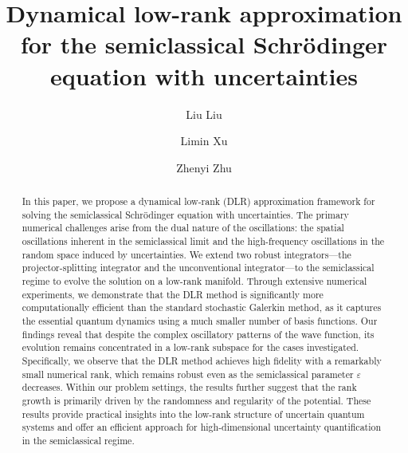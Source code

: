 \documentclass[preprint,11pt]{elsarticle}
\newcommand{\LL}[1]{\textcolor{blue}{~#1}}
\begin{document}
\title{Dynamical low-rank approximation for the semiclassical Schr\"{o}dinger equation with uncertainties}




\author[1]{Liu Liu}

\author[2]{Limin Xu}

\author[3]{Zhenyi Zhu}


\address[1]{Department of Mathematics, The Chinese University of Hong Kong, Hong Kong, 999077, China}

\address[2]{Institute for Theoretical Sciences, Westlake University, Hangzhou, 310030, China}
            
\address[3]{Department of Mathematics, The Chinese University of Hong Kong, Hong Kong, 999077, China}


\begin{abstract}
In this paper, we propose a dynamical low-rank (DLR) approximation framework for solving the semiclassical Schrödinger equation with uncertainties. The primary numerical challenges arise from the dual nature of the oscillations: the spatial oscillations inherent in the semiclassical limit and the high-frequency oscillations in the random space induced by uncertainties. We extend two robust integrators—the projector-splitting integrator and the unconventional integrator—to the semiclassical regime to evolve the solution on a low-rank manifold. Through extensive numerical experiments, we demonstrate that the DLR method is significantly more computationally efficient than the standard stochastic Galerkin method, as it captures the essential quantum dynamics using a much smaller number of basis functions. Our findings reveal that despite the complex oscillatory patterns of the wave function, its evolution remains concentrated in a low-rank subspace for the cases investigated. Specifically, we observe that the DLR method achieves high fidelity with a remarkably small numerical rank, which remains robust even as the semiclassical parameter $\varepsilon$ decreases. Within our problem settings, the results further suggest that the rank growth is primarily driven by the randomness and regularity of the potential. These results provide practical insights into the low-rank structure of uncertain quantum systems and offer an efficient approach for high-dimensional uncertainty quantification in the semiclassical regime.
\end{abstract}
\end{document}
